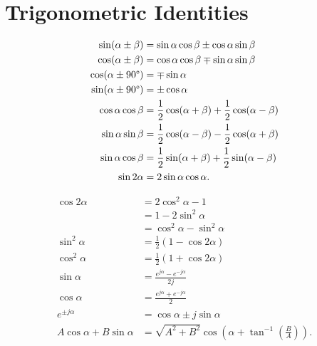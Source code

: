 \documentclass{article}
\begin{document}
\section{Trigonometric Identities}
\begin{align*}
    \sin(\alpha \pm\beta ) &= \sin\alpha \cos\beta \pm\cos\alpha \sin\beta  \\
    \cos(\alpha \pm\beta ) &=\cos\alpha \cos\beta \mp\sin\alpha \sin\beta \\
    \cos(\alpha \pm 90\degree)&= \mp\sin\alpha \\
    \sin(\alpha \pm90\degree)&= \pm\cos\alpha \\
    \cos\alpha \cos\beta &= \frac{1}{2}\cos(\alpha +\beta )+\frac{1}{2}\cos(\alpha -\beta )\\
    \sin\alpha \sin\beta &= \frac{1}{2}\cos(\alpha -\beta )-\frac{1}{2}\cos(\alpha +\beta ) \\
    \sin\alpha \cos\beta &=\frac{1}{2}\sin(\alpha +\beta)+\frac{1}{2}\sin(\alpha -\beta )\\
    \sin 2\alpha &=2\sin\alpha \cos\alpha .
\end{align*}

\begin{align*}
    \cos 2\alpha  &= 2\cos^2\alpha -1 \\
                  &=1-2\sin^2\alpha \\
                  &=\cos^2\alpha -\sin^2\alpha \\
    \sin^2\alpha &=\frac{1}{2}(1-\cos 2\alpha )\\
    \cos^2\alpha &=\frac{1}{2}(1+\cos 2\alpha ) \\
    \sin\alpha&= \frac{e^{j\alpha }-e^{-j\alpha }}{2j}\\
    \cos\alpha&=\frac{e^{j\alpha }+e^{-j\alpha }}{2} \\
    e^{\pm j\alpha }&=\cos\alpha \pm j\sin\alpha  \\
    A\cos\alpha +B\sin\alpha &=\sqrt{A^2+B^2}\cos \left( \alpha +\tan^{-1}\left( \frac{B}{A} \right) \right).
\end{align*}
\end{document}
